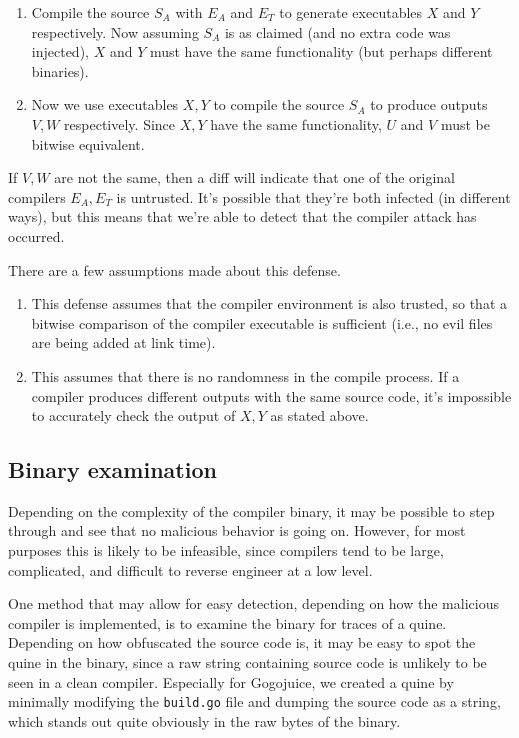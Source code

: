 \documentclass[10pt]{sigplanconf}
\begin{document}
\begin{enumerate}
\item Compile the source $S_A$ with $E_A$ and $E_T$ to generate executables $X$ and $Y$ respectively. Now assuming $S_A$ is as claimed (and no extra code was injected), $X$ and $Y$ must have the same functionality (but perhaps different binaries).
\item Now we use executables $X, Y$ to compile the source $S_A$ to produce outputs $V,W$ respectively. Since $X,Y$ have the same functionality, $U$ and $V$ must be bitwise equivalent.
\end{enumerate}

If $V,W$ are not the same, then a diff will indicate that one of the original compilers $E_A, E_T$ is untrusted. It’s possible that they’re both infected (in different ways), but this means that we’re able to detect that the compiler attack has occurred.

There are a few assumptions made about this defense.

\begin{enumerate}
\item This defense assumes that the compiler environment is also trusted, so that a bitwise comparison of the compiler executable is sufficient (i.e., no evil files are being added at link time).
\item This assumes that there is no randomness in the compile process. If a compiler produces different outputs with the same source code, it’s impossible to accurately check the output of $X,Y$ as stated above.
\end{enumerate}


\subsection{Binary examination}

Depending on the complexity of the compiler binary, it may be possible to step through and see that no malicious behavior is going on. However, for most purposes this is likely to be infeasible, since compilers tend to be large, complicated, and difficult to reverse engineer at a low level.

One method that may allow for easy detection, depending on how the malicious compiler is implemented, is to examine the binary for traces of a quine. Depending on how obfuscated the source code is, it may be easy to spot the quine in the binary, since a raw string containing source code is unlikely to be seen in a clean compiler. Especially for Gogojuice, we created a quine by minimally modifying the \texttt{build.go} file and dumping the source code as a string, which stands out quite obviously in the raw bytes of the binary.
\end{document}
